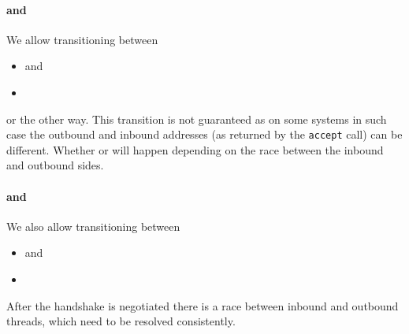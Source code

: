 \paragraph{\SelfConn{} and \SelfConnRev{}}
We allow transitioning between
\begin{itemize}
  \item\UnnegotiatedStateOut{} and
  \item\UnnegotiatedStateIn{}
\end{itemize}
or the other way.  This transition is not guaranteed as on some systems in
such case the outbound and inbound addresses (as returned by the
\texttt{accept} call) can be different.  Whether \SelfConn{} or \SelfConnRev{}
will happen depending on the race between the inbound and outbound sides.

\paragraph{\SelfConnPrim{} and \SelfConnPrimRev{}}
We also allow transitioning between
\begin{itemize}
  \item\InboundIdleStateAny{} and
  \item\OutboundStateAny{}
\end{itemize}

After the handshake is negotiated there is a race between inbound and outbound
threads, which need to be resolved consistently.


